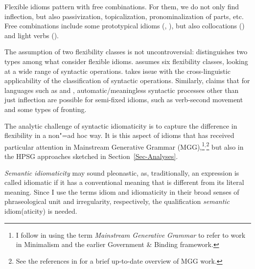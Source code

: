 \documentclass[output=paper
                ,modfonts
                ,nonflat
	        ,collection
	        ,collectionchapter
	        ,collectiontoclongg
 	        ,biblatex
                ,babelshorthands
                ,newtxmath
                ,draftmode
                ,colorlinks, citecolor=brown
]{./langsci/langscibook}
\begin{document}
\eal \label{kick-ex} 
\zl 



Flexible idioms pattern with free combinations. For them, we do not only find inflection, but also passivization, topicalization, pronominalization of parts, etc. Free combinations include some prototypical idioms (, ), but also collocations () and light verbs ().

The assumption of two flexibility classes is not uncontroversial: 
\citet{Horn:03} distinguishes two types among what \citet{SBBCF2002a-ausgedruckt} consider flexible idioms. 
\citet{Fraser:70} assumes six flexibility classes, looking at a wide range of syntactic operations.
\citet{Ruwet:91} takes issue with the cross-linguistic applicability of the classification of syntactic operations. Similarly, \citet{Schenk:95} claims that for languages such as  and , automatic/meaningless syntactic processes other than just inflection are possible for semi-fixed idioms, such as verb-second movement and some types of fronting.

The analytic challenge of syntactic idiomaticity is to capture the difference in flexibility in a
non"=ad hoc way. It is this aspect of idioms that has received particular attention in Mainstream
Generative Grammar (MGG),\footnote{%
  I follow \citet[]{CJ2005a} in using the term \emph{Mainstream Generative Grammar} to
  refer to work in Minimalism and the earlier Government \& Binding framework.}$^,$\footnote{See the
  references in \citet{Corver:al:19} for a brief up-to-date overview of MGG work.}
but also in the HPSG approaches sketched in Section~\ref{Sec-Analyses}.

\emph{Semantic idiomaticity} may sound pleonastic, as, traditionally, an expression is called idiomatic if it has a conventional meaning that is different from its literal meaning. 
Since I use the terms idiom and idiomaticity in their broad senses of phraseological unit and irregularity, respectively, the qualification \emph{semantic} idiom(aticity) is needed. 
\end{document}
